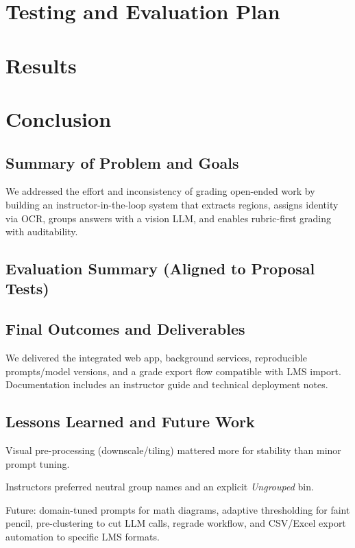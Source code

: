 \documentclass[ms,twoside,print]{nuthesis}
\begin{document}

\chapter{Testing and Evaluation Plan}\label{chap:evalplan}


\chapter{Results}\label{chap:results}


\chapter{Conclusion}
\section{Summary of Problem and Goals}
We addressed the effort and inconsistency of grading open-ended work by building an instructor-in-the-loop system that extracts regions, assigns identity via OCR, groups answers with a vision LLM, and enables rubric-first grading with auditability.

\section{Evaluation Summary (Aligned to Proposal Tests)}

\section{Final Outcomes and Deliverables}
We delivered the integrated web app, background services, reproducible prompts/model versions, and a grade export flow compatible with LMS import. Documentation includes an instructor guide and technical deployment notes.

\section{Lessons Learned and Future Work}
\begin{compactitem}
  \item Visual pre-processing (downscale/tiling) mattered more for stability than minor prompt tuning.
  \item Instructors preferred neutral group names and an explicit \emph{Ungrouped} bin.
  \item Future: domain-tuned prompts for math diagrams, adaptive thresholding for faint pencil, pre-clustering to cut LLM calls, regrade workflow, and CSV/Excel export automation to specific LMS formats.
\end{compactitem}
\end{document}

